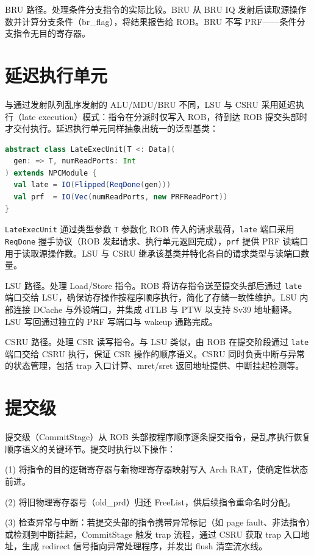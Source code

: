 BRU 路径。处理条件分支指令的实际比较。BRU 从 BRU IQ 发射后读取源操作数并计算分支条件（br\_flag），将结果报告给 ROB。BRU 不写 PRF——条件分支指令无目的寄存器。

\section{延迟执行单元}\label{sec:late-exec}

与通过发射队列乱序发射的 ALU/MDU/BRU 不同，LSU 与 CSRU 采用延迟执行（late execution）模式：指令在分派时仅写入 ROB，待到达 ROB 提交头部时才交付执行。延迟执行单元同样抽象出统一的泛型基类：

\begin{lstlisting}[language=Scala,caption={延迟执行单元抽象基类定义},label={lst:late-exec-abs}]
abstract class LateExecUnit[T <: Data](
  gen: => T, numReadPorts: Int
) extends NPCModule {
  val late = IO(Flipped(ReqDone(gen)))
  val prf  = IO(Vec(numReadPorts, new PRFReadPort))
}
\end{lstlisting}

\lstinline|LateExecUnit| 通过类型参数 \lstinline|T| 参数化 ROB 传入的请求载荷，\lstinline|late| 端口采用 \lstinline|ReqDone| 握手协议（ROB 发起请求、执行单元返回完成），\lstinline|prf| 提供 PRF 读端口用于读取源操作数。LSU 与 CSRU 继承该基类并特化各自的请求类型与读端口数量。

LSU 路径。处理 Load/Store 指令。ROB 将访存指令送至提交头部后通过 \lstinline|late| 端口交给 LSU，确保访存操作按程序顺序执行，简化了存储一致性维护。LSU 内部连接 DCache 与外设端口，并集成 dTLB 与 PTW 以支持 Sv39 地址翻译。LSU 写回通过独立的 PRF 写端口与 wakeup 通路完成。

CSRU 路径。处理 CSR 读写指令。与 LSU 类似，由 ROB 在提交阶段通过 \lstinline|late| 端口交给 CSRU 执行，保证 CSR 操作的顺序语义。CSRU 同时负责中断与异常的状态管理，包括 trap 入口计算、mret/sret 返回地址提供、中断挂起检测等。

\section{提交级}

提交级（CommitStage）从 ROB 头部按程序顺序逐条提交指令，是乱序执行恢复顺序语义的关键环节。提交时执行以下操作：

(1) 将指令的目的逻辑寄存器与新物理寄存器映射写入 Arch RAT，使确定性状态前进。

(2) 将旧物理寄存器号（old\_prd）归还 FreeList，供后续指令重命名时分配。

(3) 检查异常与中断：若提交头部的指令携带异常标记（如 page fault、非法指令）或检测到中断挂起，CommitStage 触发 trap 流程，通过 CSRU 获取 trap 入口地址，生成 redirect 信号指向异常处理程序，并发出 flush 清空流水线。

